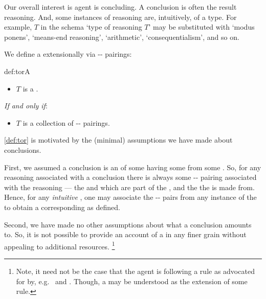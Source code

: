 \begin{note}
  Our overall interest is agent is concluding.
  A conclusion is often the result reasoning.
  And, some instances of reasoning are, intuitively, of a type.
  For example, \(T\) in the schema `type of reasoning \(T\)' may be substituted with `modus ponens', `means-end reasoning', `arithmetic', `consequentialism', and so on.

  We define a  extensionally via -- pairings:

  \begin{rdefinition}{def:tor}{A }
    \mbox{ }
    \vspace{-\baselineskip}
    \begin{itemize}
    \item
      \(T\) is a \torN{}.
    \end{itemize}

    \emph{If and only if}:

    \begin{itemize}
    \item
      \(T\) is a collection of -- pairings.
    \end{itemize}
    \vspace{-\baselineskip}
  \end{rdefinition}

  \noindent%
  \autoref{def:tor} is motivated by the (minimal) assumptions we have made about conclusions.

  First, we assumed a conclusion is an \evalion{} of some  having some  from some .
  So, for any reasoning associated with a conclusion there is always some -- pairing associated with the reasoning --- the  and  which are part of the \evalion{}, and the  the \evalion{} is made from.
  Hence, for any \emph{intuitive} \torN{}, one may associate the -- pairs from any instance of the \torNa{} to obtain a corresponding \torN{} as defined.

  Second, we have made no other assumptions about what a conclusion amounts to.
  So, it is not possible to provide an account of a  in any finer grain without appealing to additional resources.%
  \footnote{
    Note, it need not be the case that the agent is following a rule as advocated for by, e.g.\ \textcite{Boghossian:2008vf,Boghossian:2012vb} and \textcite{Broome:2002aa,Broome:2013aa}.
    Though, a \torNa{} may be understood as the extension of some rule.
  }
\end{note}


